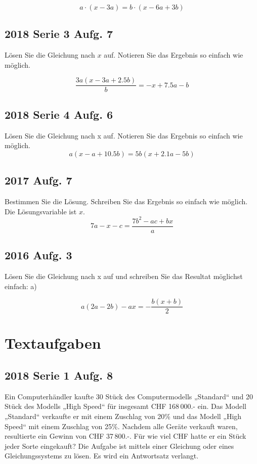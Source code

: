 $$a\cdot{} (x-3a) = b\cdot{} (x-6a+3b)$$

\subsection{2018 Serie 3 Aufg. 7}
Lösen Sie die Gleichung nach $x$ auf.
Notieren Sie das Ergebnis so einfach wie möglich.

$$\frac{3a (x-3a+2.5b)}{b}  =  -x + 7.5a -b$$

\subsection{2018 Serie 4 Aufg. 6}
Lösen Sie die Gleichung nach x auf.
Notieren Sie das Ergebnis so einfach wie möglich.
$$ a(x - a + 10.5b) = 5b( x + 2.1a - 5b)$$


\subsection{2017 Aufg. 7}
Bestimmen Sie die Lösung. Schreiben Sie das Ergebnis so einfach wie möglich.
Die Lösungsvariable ist $x$.
$$7a - x - c = \frac{7b^2 -ac + bx}{a}$$


\subsection{2016 Aufg. 3}

Lösen Sie die Gleichung nach x auf und schreiben Sie das Resultat möglichst einfach:
a)

$$a(2a-2b)  - ax = - \frac{b(x+b)}{2}$$


\section{Textaufgaben}

\subsection{2018 Serie 1 Aufg. 8}
Ein Computerhändler kaufte 30 Stück des Computermodells „Standard“ und
20 Stück des Modells „High Speed“ für insgesamt CHF 168\,000.- ein.
Das Modell „Standard“ verkaufte er mit einem Zuschlag von 20\% und das
Modell „High Speed“ mit einem Zuschlag von 25\%. Nachdem alle Geräte
verkauft waren, resultierte ein Gewinn von CHF 37\,800.-.
Für wie viel CHF hatte er ein Stück jeder Sorte eingekauft?
Die Aufgabe ist mittels einer Gleichung oder eines Gleichungssystems zu lösen.
Es wird ein Antwortsatz verlangt.

